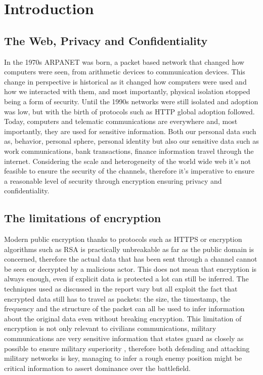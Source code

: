 \section{Introduction}
\subsection{The Web, Privacy and Confidentiality}
In the 1970s ARPANET was born, a packet based network that changed how computers were seen, from arithmetic devices to communication devices. 
This change in perspective is historical as it changed how computers were used and how we interacted with them, and most importantly, physical isolation stopped being a form of security.\cite{hauben_arpanet}
Until the 1990s networks were still isolated and adoption was low, but with the birth of protocols such as HTTP global adoption followed.
Today, computers and telematic communications are everywhere and, most importantly, they are used for sensitive information.
Both our personal data such as, behavior, personal sphere, personal identity but also our sensitive data such as work communications, bank transactions, finance information travel through the internet.
Considering the scale and heterogeneity of the world wide web it's not feasible to ensure the security of the channels, therefore it's imperative to ensure a reasonable level of security through encryption ensuring privacy and confidentiality. 

\subsection{The limitations of encryption}
Modern public encryption thanks to protocols such as HTTPS or encryption algorithms such as RSA is practically unbreakable as far as the public domain is concerned, therefore the actual data that has been sent through a channel cannot be seen or decrypted by a malicious actor.
This does not mean that encryption is always enough, even if explicit data is protected a lot can still be inferred.
The techniques used as discussed in the report vary but all exploit the fact that encrypted data still has to travel as packets:
the size, the timestamp, the frequency and the structure of the packet can all be used to infer information about the original data even without breaking encryption. 
This limitation of encryption is not only relevant to civilians communications, military communications are very sensitive information that states guard as closely as possible to ensure military superiority \cite{sahu2024military}, therefore both defending and attacking military networks is key, managing to infer a rough enemy position might be critical information to assert dominance over the battlefield.  


